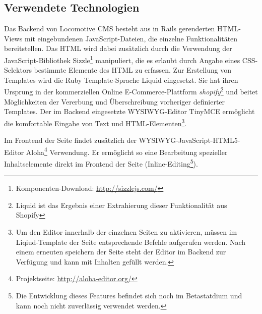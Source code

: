 \subsection{Verwendete Technologien}
\label{sec:TechnologienLocomotive}
Das Backend von Locomotive CMS besteht aus in Rails gerenderten HTML-Views mit eingebundenen JavaScript-Dateien, die einzelne Funktionalitäten bereitstellen. Das HTML wird dabei zusätzlich durch die Verwendung der JavaScript-Bibliothek Sizzle\footnote{Komponenten-Download: \href{http://sizzlejs.com/}{http://sizzlejs.com/}} manipuliert, die es erlaubt durch Angabe eines CSS-Selektors bestimmte Elemente des HTML zu erfassen.
Zur Erstellung von Templates wird die Ruby Template-Sprache Liquid eingesetzt. Sie hat ihren Ursprung in der kommerziellen Online E-Commerce-Plattform \emph{shopify}\footnote{Liquid ist das Ergebnis einer Extrahierung dieser Funktionalität aus Shopify} und beitet Möglichkeiten der Vererbung und Überschreibung vorheriger definierter Templates.
Der im Backend eingesetzte WYSIWYG-Editor TinyMCE ermöglicht die komfortable Eingabe von Text und HTML-Elementen\footnote{Um den Editor innerhalb der einzelnen Seiten zu aktivieren, müssen im Liqiud-Template der Seite entsprechende Befehle aufgerufen werden. Nach einem erneuten speichern der Seite steht der Editor im Backend zur Verfügung und kann mit Inhalten gefüllt werden.}.

Im Frontend der Seite findet zusätzlich der WYSIWYG-JavaScript-HTML5-Editor Aloha\footnote{Projektseite: \href{http://aloha-editor.org/}{http://aloha-editor.org/}} Verwendung. Er ermöglicht so eine Bearbeitung spezieller Inhaltselemente direkt im Frontend der Seite (Inline-Editing\footnote{Die Entwicklung dieses Features befindet sich noch im Betastatdium und kann noch nicht zuverlässig verwendet werden.}).

